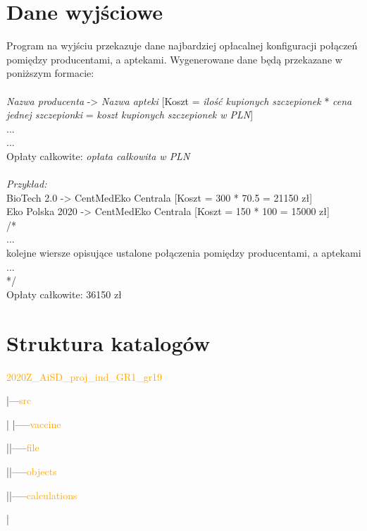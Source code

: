 \documentclass[]{article}
\begin{document}
\clearpage

\section{Dane wyjściowe}
Program na wyjściu przekazuje dane najbardziej opłacalnej konfiguracji połączeń pomiędzy producentami,
a aptekami. Wygenerowane dane będą przekazane w poniższym formacie:\\\\
\textit{Nazwa producenta} -> 
\textit{Nazwa apteki} [Koszt = 
\textit{ilość kupionych szczepionek} * 
\textit{cena jednej szczepionki} = 
\textit{koszt kupionych szczepionek w PLN}]\\
...\\
...\\
Opłaty całkowite: 
\textit{opłata całkowita w PLN}\\\\
\emph{Przykład:}\\
BioTech 2.0
\hspace{7mm} -> CentMedEko Centrala [Koszt = 300 * 70.5 = 21150 zł]\\
Eko Polska 2020  -> CentMedEko Centrala [Koszt = 150 * 100 = 15000 zł]\\
/*\\
...\\
kolejne wiersze opisujące ustalone połączenia pomiędzy producentami, a aptekami\\
...\\
*/\\
Opłaty całkowite: 36150 zł\\


\section{Struktura katalogów}
\textcolor{orange}{2020Z\_AiSD\_proj\_ind\_GR1\_gr19}

	|---\textcolor{orange}{src}
	
	|\hspace{4mm} |-----\textcolor{orange}{vaccine}

	|\hspace{15mm}|-----\textcolor{orange}{file}
	
	|\hspace{15mm}|-----\textcolor{orange}{objects}
	
	|\hspace{15mm}|-----\textcolor{orange}{calculations}
	
	|
	
\end{document}
